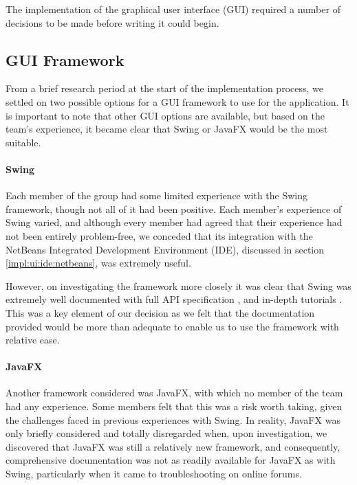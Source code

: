 The implementation of the graphical user interface (GUI) required a number
of decisions to be made before writing it could begin.


\subsection{GUI Framework}
\label{impl:ui:guiframework}

From a brief research period at the start of the implementation 
process, we settled on two possible options for a GUI framework to use
for the application. It is important to note that other GUI options are
available, but based on the team's experience, it became clear that
Swing\cite{swingAPI} or JavaFX\cite{javafxOverview} would be the most
suitable.


\paragraph{Swing}
\label{impl:ui:guiframework:swing}

Each member of the group had some limited experience with the Swing 
framework, though not all of it had been positive.
Each member's experience of Swing varied, and
although every member had agreed that their experience had not been
entirely problem-free, we conceded that its integration with the NetBeans
Integrated Development Environment (IDE), discussed in section
\ref{impl:ui:ide:netbeans}, was extremely useful.

However, on investigating the framework more closely it was clear that
Swing was extremely well documented with full API specification
\cite{swingAPI}, and in-depth tutorials \cite{swingTutorial}.
This was a key element of our decision as we felt that the documentation
provided would be more than adequate to enable us to use the framework
with relative ease.


\paragraph{JavaFX}
\label{impl:ui:guiframework:javafx}

Another framework considered was JavaFX, with which no member of the team
had any experience. 
Some members felt that this was a risk worth taking, given the challenges
faced in previous experiences with Swing.
In reality, JavaFX was only briefly considered and totally disregarded
when, upon investigation, we discovered that JavaFX was still a relatively
new framework, and consequently, comprehensive documentation was not as
readily available for JavaFX as with Swing, particularly when it came 
to troubleshooting on online forums.

